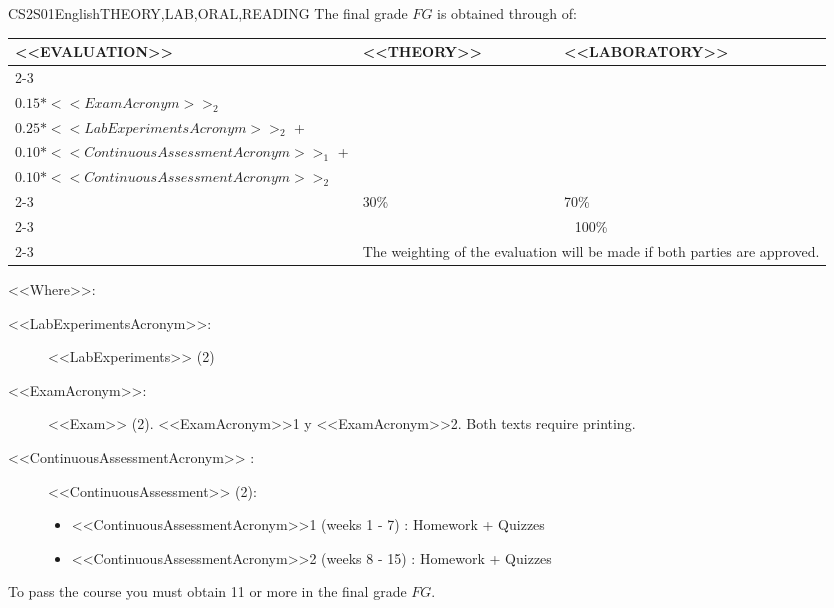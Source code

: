   \begin{evaluation}{CS2S01}{English}{THEORY,LAB,ORAL,READING}
  The final grade $FG$ is obtained through of:
 
  \begin{tabularx}{0.9\textwidth}{|X|p{}|p{}|} \hline
  \multirow{4}{*}{\uppercase{<<Evaluation>>}} & \uppercase{<<Theory>>} & \uppercase{<<Laboratory>>} \\ \cline{2-3}
  & %
      \begin{minipage}{0.95\textwidth}
      \begin{tabular}{l}
          $0.15*<<ExamAcronym>>_{1}$ + \\
          $0.15*<<ExamAcronym>>_{2}$
          \end{tabular} 
      \end{minipage} 
  & %
      \begin{minipage}{0.95\textwidth}
      \begin{tabular}{l}
          $0.25*<<LabExperimentsAcronym>>_{1}$ + \\
          $0.25*<<LabExperimentsAcronym>>_{2}$ + \\
          $0.10*<<ContinuousAssessmentAcronym>>_{1}$ + \\
          $0.10*<<ContinuousAssessmentAcronym>>_{2}$
      \end{tabular} 
      \end{minipage}                 \\ \cline{2-3}
  & %
  30\% 
  & %
  70\% \\ \cline{2-3}
  & \multicolumn{2}{|c|}{100\%}  \\ \cline{2-3}
  & \multicolumn{2}{|c|}{The weighting of the evaluation will be made if both parties are approved.}  \\ \hline
  \end{tabularx}
      
  \vspace{2mm}
  \noindent <<Where>>:
  \begin{description}
    \item[<<LabExperimentsAcronym>>:] <<LabExperiments>> (2)
    \item[<<ExamAcronym>>:] <<Exam>> (2). <<ExamAcronym>>1 y <<ExamAcronym>>2. Both texts require printing.
    \item[<<ContinuousAssessmentAcronym>> :] <<ContinuousAssessment>> (2):
      \begin{itemize}
        \item  <<ContinuousAssessmentAcronym>>1 (weeks 1 - 7) :  Homework + Quizzes
        \item <<ContinuousAssessmentAcronym>>2 (weeks 8 - 15) : Homework + Quizzes
      \end{itemize}
  \end{description}

  \noindent To pass the course you must obtain 11 or more in the final grade $FG$.
  \end{evaluation}

